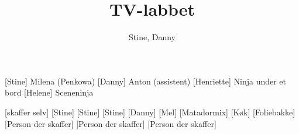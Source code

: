 \documentclass[a4paper,11pt]{article}
\title{TV-labbet}
\author{Stine, Danny}
\begin{document}
\maketitle

\begin{roles}
	[Stine] Milena (Penkowa)
	[Danny] Anton (assistent)
	[Henriette] Ninja under et bord
	[Helene] Sceneninja
\end{roles}

\begin{props}
	[skaffer selv]
	[Stine]
	[Stine]
	[Stine]
	[Danny]
	[Mel]
	[Matadormix]
	[Køk]
	[Foliebakke]
	[Person der skaffer]
	[Person der skaffer]
	[Person der skaffer]
\end{props}
\end{document}
